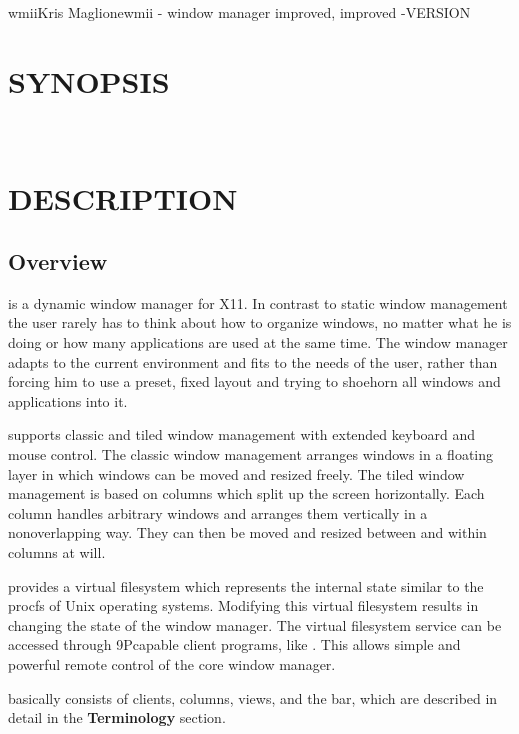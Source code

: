 \begin{Name}{1}{wmii}{Kris Maglione}{}{wmii - window manager improved, improved}
	-VERSION
\end{Name}

\section{SYNOPSIS}
   \\
 

\section{DESCRIPTION}

\subsection{Overview}

 is a dynamic window manager for X11. In contrast to
static window management the user rarely has to think about how
to organize windows, no matter what he is doing or how many
applications are used at the same time.  The window manager
adapts to the current environment and fits to the needs of the
user, rather than forcing him to use a preset, fixed layout and
trying to shoehorn all windows and applications into it.

 supports classic and tiled window management with
extended keyboard and mouse control. The classic window
management arranges windows in a floating layer in which windows
can be moved and resized freely. The tiled window management is
based on columns which split up the screen horizontally. Each
column handles arbitrary windows and arranges them vertically in
a non\-overlapping way. They can then be moved and resized
between and within columns at will.

 provides a virtual filesystem which represents the
internal state similar to the procfs of Unix operating systems.
Modifying this virtual filesystem results in changing the state
of the window manager. The virtual filesystem service can be
accessed through 9P\-capable client programs, like
.  This allows simple and powerful remote control
of the core window manager.

 basically consists of clients, columns, views, and
the bar, which are described in detail in the
\textbf{Terminology} section.

